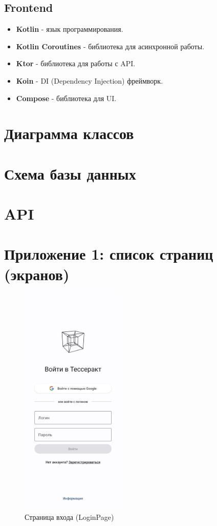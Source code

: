 \documentclass[a4paper, 14pt]{article}
\begin{document}
\subsection{Frontend}

\begin{itemize}
    \item \textbf{Kotlin} - язык программирования.
    \item \textbf{Kotlin Coroutines} - библиотека для асинхронной работы.
    \item \textbf{Ktor} - библиотека для работы с API.
    \item \textbf{Koin} - DI (Dependency Injection) фреймворк.
    \item \textbf{Compose} - библиотека для UI.
\end{itemize}

\section{Диаграмма классов}

\section{Схема базы данных}

\section{API}

\newpage
\section{Приложение 1: список страниц (экранов)}

\begin{figure}[H]
    \centering
    \includegraphics[width=5cm]{resources/4.png}
    \caption{Страница входа (LoginPage)}
\end{figure}
\end{document}
